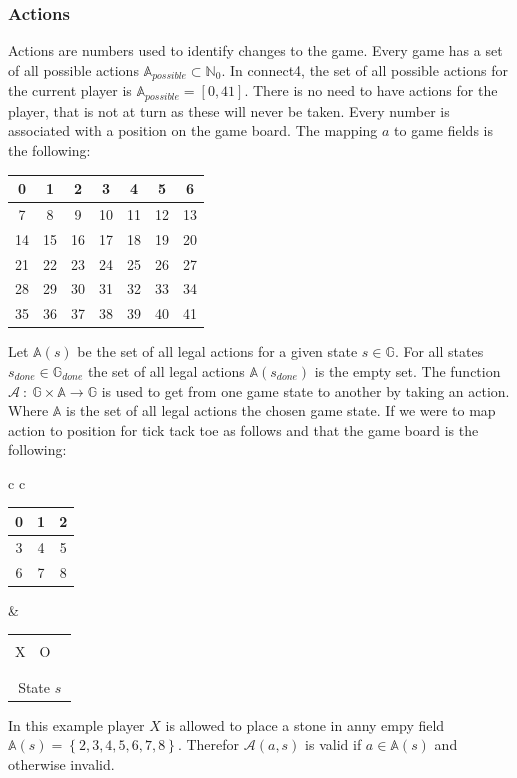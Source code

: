\documentclass[12pt]{article}
\newcommand{\tickTackToe}[9]{
\begin{tabular}{p{7px}|p{7px}|p{7px}}
\multicolumn{3}{c}{}\\
  #1 & #2 & #3 \\      \hline
  #4 & #5 & #6 \\      \hline
   & #7 & #8\\
\multicolumn{3}{c}{#9}
\end{tabular}
}
\begin{document}
\subsubsection{Actions}
Actions are numbers used to identify changes to the game. Every game has a set of all possible actions \(\mathbb{A}_{possible} \subset \mathbb{N}_0\). In connect4, the set of all possible actions for the current player is \(\mathbb{A}_{possible} = [0, 41]\). There is no need to have actions for the player, that is not at turn as these will never be taken. Every number is associated with a position on the game board. The mapping \(a\) to game fields is the following:
\begin{center}
\begin{tabular}{| c | c | c | c | c | c | c |}
 \hline
0 & 1 & 2 & 3 & 4 & 5 & 6  \\\hline
7 & 8 & 9 & 10 & 11 & 12 & 13\\\hline
14 & 15 & 16 & 17 & 18 & 19 & 20 \\\hline
21 & 22 & 23& 24 & 25 & 26 & 27 \\\hline
28 & 29 & 30 & 31 & 32 & 33 & 34 \\\hline
35 & 36 & 37 & 38 & 39 & 40 & 41 \\\hline
\end{tabular}
\end{center}
Let \(\mathbb{A}(s)\) be the set of all legal actions for a given state  \(s \in \mathbb{G}\). For all states \(s_{done} \in \mathbb{G}_{done}\) the set of all legal actions \(\mathbb{A}(s_{done})\) is the empty set. The function \(\mathcal{A}~:~\mathbb{G}\times\mathbb{A}\to\mathbb{G}\) is used to get from one game state to another by taking an action. Where \(\mathbb A\) is the set of all legal actions the chosen game state. If we were to map action to position for tick tack toe as follows and that the game board is the following:
\begin{center}\begin{tabular} { c c }
\begin{tabular}{| c | c | c |}
 \hline
 0 & 1 & 2 \\\hline
 3 & 4 & 5 \\\hline
 6 & 7 & 8 \\\hline
\end{tabular} & \tickTackToe{X}{O}{}{}{}{}{}{}{State \(s\)}
\end{tabular}\end{center}
In this example player \(X\) is allowed to place a stone in anny empy field \(\mathbb A(s) = \left\{ 2, 3, 4, 5, 6, 7, 8 \right\}\). Therefor \(\mathcal A(a, s)\) is valid if \(a \in \mathbb A(s)\) and otherwise invalid.
\end{document}
